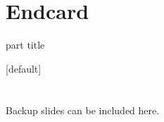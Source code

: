 \documentclass[10pt,compress,
               xcolor={dvipsnames,table},
               hyperref={breaklinks}
              ]{beamer}
\begin{document}
\section*{Endcard}

\begin{frame}[plain]
  \begin{centering}
    \begin{beamercolorbox}[sep=16pt,center]{part title} 
    \end{beamercolorbox} 
  \end{centering}
\end{frame}

\appendix
{}[default]
\section{\appendixname}

\bgroup
{}
\begin{frame}[plain]{}
\end{frame}
\egroup

\begin{frame}
  \frametitle{\insertsection}
  Backup slides can be included here.

  \blindtext
\end{frame}
\end{document}
